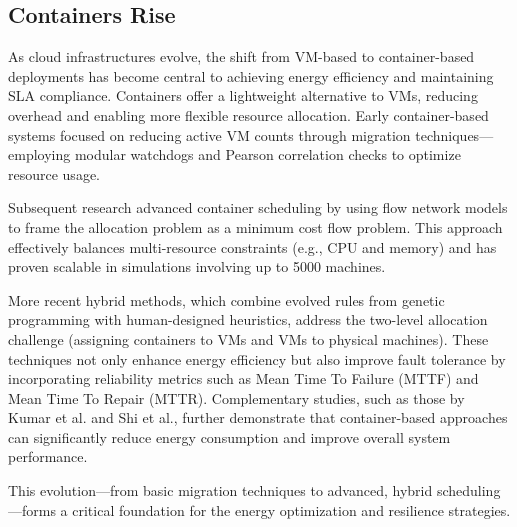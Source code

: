 \begin{multicols}{2}


\subsection{Containers Rise}

As cloud infrastructures evolve, the shift from VM-based to container-based deployments has become central to achieving energy efficiency and maintaining SLA compliance. Containers offer a lightweight alternative to VMs, reducing overhead and enabling more flexible resource allocation\cite{alahmad_availability-aware_2018}. Early container-based systems focused on reducing active VM counts through migration techniques—employing modular watchdogs and Pearson correlation checks to optimize resource usage\cite{alahmad_availability-aware_2018}.

Subsequent research advanced container scheduling by using flow network models to frame the allocation problem as a minimum cost flow problem. This approach effectively balances multi-resource constraints (e.g., CPU and memory) and has proven scalable in simulations involving up to 5000 machines\cite{hu_concurrent_2020}. 

More recent hybrid methods, which combine evolved rules from genetic programming with human-designed heuristics, address the two-level allocation challenge (assigning containers to VMs and VMs to physical machines). These techniques not only enhance energy efficiency but also improve fault tolerance by incorporating reliability metrics such as Mean Time To Failure (MTTF) and Mean Time To Repair (MTTR)\cite{tan_hybrid_2019, alahmad_availability-aware_2018}. Complementary studies, such as those by Kumar et al.\cite{kumar_renewable_2019} and Shi et al.\cite{shi_energy-aware_2018}, further demonstrate that container-based approaches can significantly reduce energy consumption and improve overall system performance.

This evolution—from basic migration techniques to advanced, hybrid scheduling—forms a critical foundation for the energy optimization and resilience strategies.


\end{multicols}


